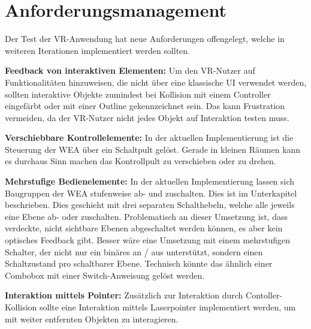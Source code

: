 \section{Anforderungsmanagement}
\label{sec:Anforderungsmanagement}

Der Test der VR-Anwendung hat neue Anforderungen offengelegt, welche in weiteren Iterationen implementiert werden sollten. 

\textbf{Feedback von interaktiven Elementen:} Um den VR-Nutzer auf Funktionalitäten hinzuweisen, die nicht über eine klassische UI verwendet werden, sollten interaktive Objekte zumindest bei Kollision mit einem Controller eingefärbt oder mit einer Outline gekennzeichnet sein. Das kann Frustration vermeiden, da der VR-Nutzer nicht jedes Objekt auf Interaktion testen muss.  
 
\textbf{Verschiebbare Kontrollelemente:} In der aktuellen Implementierung ist die Steuerung der WEA über ein Schaltpult gelöst. Gerade in kleinen Räumen kann es durchaus Sinn machen das Kontrollpult zu verschieben oder zu drehen.

\textbf{Mehrstufige Bedienelemente:} In der aktuellen Implementierung lassen sich Baugruppen der WEA stufenweise ab- und zuschalten. Dies ist im Unterkapitel   beschrieben. Dies geschieht mit drei separaten Schalthebeln, welche alle jeweils eine Ebene ab- oder zuschalten. Problematisch an dieser Umsetzung ist, dass verdeckte, nicht sichtbare Ebenen abgeschaltet werden können, es aber kein optisches Feedback gibt. 
Besser wäre eine Umsetzung mit einem mehrstufigen Schalter, der nicht nur ein binäres an / aus unterstützt, sondern einen Schaltzustand pro schaltbarer Ebene. Technisch könnte das ähnlich einer Combobox mit einer Switch-Anweisung gelöst werden.

\textbf{Interaktion mittels Pointer:} Zusätzlich zur Interaktion durch Contoller-Kollision sollte eine Interaktion mittels Laserpointer implementiert werden, um mit weiter entfernten Objekten zu interagieren.